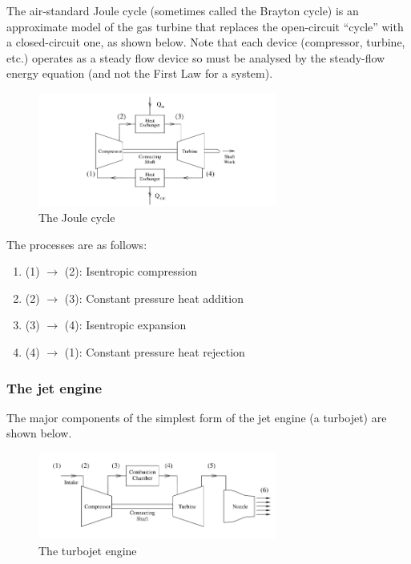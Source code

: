 \documentclass{article}
\begin{document}
\begin{proposition}
    The air-standard Joule cycle (sometimes called the Brayton cycle) is an approximate model of
the gas turbine that replaces the open-circuit “cycle” with a closed-circuit one, as shown below.
Note that each device (compressor, turbine, etc.) operates as a steady flow device so must be
analysed by the steady-flow energy equation (and not the First Law for a system). 
\end{proposition}

\begin{figure}[h]
    \centering
    \includegraphics[width = 0.7\textwidth]{images/Screenshot 2024-04-03 213737.png}
    \caption{The Joule cycle}
    \label{fig:enter-label}
\end{figure}

The processes are as follows:

\begin{enumerate}
    \item (1) $\to$ (2): Isentropic compression
    \item (2) $\to$ (3): Constant pressure heat addition
    \item (3) $\to$ (4): Isentropic expansion
    \item (4) $\to$ (1): Constant pressure heat rejection
\end{enumerate}

\subsubsection{The jet engine}

The major components of the simplest form of the jet engine (a turbojet) are shown below.

\begin{figure}[h]
    \centering
    \includegraphics[width = 0.7\textwidth]{images/Screenshot 2024-04-03 214021.png}
    \caption{The turbojet engine}
    \label{fig:enter-label}
\end{figure}
\end{document}
